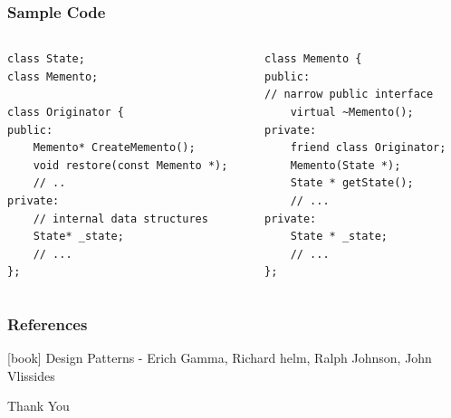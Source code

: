 \documentclass{beamer}
\begin{document}
\begin{frame}[fragile]
\frametitle{Sample Code}
    
    \begin{columns}
    \begin{column}{0.48\textwidth}
    \begin{lstlisting}
class State;
class Memento;

class Originator {
public:
    Memento* CreateMemento();
    void restore(const Memento *);
    // ..
private:
    // internal data structures
    State* _state;
    // ...
};
    \end{lstlisting}
    \end{column}
    \begin{column}{0.48\textwidth}
    \begin{lstlisting}
class Memento {
public:
// narrow public interface
    virtual ~Memento();
private:
    friend class Originator;
    Memento(State *);
    State * getState();
    // ...
private:
    State * _state;
    // ...
};
    \end{lstlisting}
    \end{column}
\end{columns}
    
\end{frame}


\begin{frame}
\frametitle{References}
\begin{thebibliography}{2} %
[book]
 Design Patterns - Erich Gamma, Richard helm, Ralph Johnson, John Vlissides
\end{thebibliography}
\end{frame}


\begin{frame}
\Huge{\centerline{Thank You}}
\end{frame}





\end{document}
